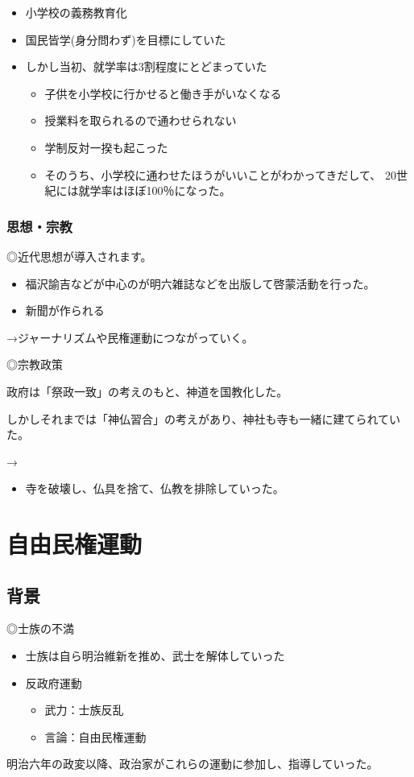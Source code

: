\documentclass[12pt,fleqn]{ltjsarticle}
\begin{document}
\begin{itemize}
\item 小学校の義務教育化
\item 国民皆学(身分問わず)を目標にしていた
\item しかし当初、就学率は3割程度にとどまっていた
\begin{itemize}
\item 子供を小学校に行かせると働き手がいなくなる
\item 授業料を取られるので通わせられない
\item 学制反対一揆も起こった
\item そのうち、小学校に通わせたほうがいいことがわかってきだして、
20世紀には就学率はほぼ100％になった。
\end{itemize}
\end{itemize}

\subsubsection{思想・宗教}
◎近代思想が導入されます。
\begin{itemize}
\item 福沢諭吉などが中心のが明六雑誌などを出版して啓蒙活動を行った。
\item 新聞が作られる
\end{itemize}
→ジャーナリズムや民権運動につながっていく。

◎宗教政策

政府は「祭政一致」の考えのもと、神道を国教化した。

しかしそれまでは「神仏習合」の考えがあり、神社も寺も一緒に建てられていた。

→
\begin{itemize}
\item {}

寺を破壊し、仏具を捨て、仏教を排除していった。
\end{itemize}

\section{自由民権運動}
\subsection{背景}
◎士族の不満
\begin{itemize}
\item 士族は自ら明治維新を推め、武士を解体していった
\item 反政府運動
\begin{itemize}
\item 武力：士族反乱
\item 言論：自由民権運動
\end{itemize}
\end{itemize}
明治六年の政変以降、政治家がこれらの運動に参加し、指導していった。
\end{document}
